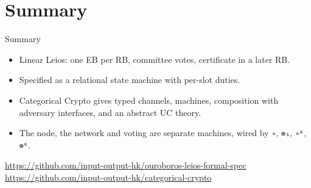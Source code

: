 \documentclass[aspectratio=169,10pt]{beamer}
\newcommand{\agda}[1]{\texttt{#1}}
\begin{document}
\section{Summary}


\begin{frame}{Summary}
  \begin{itemize}
    \item Linear Leios: one EB per RB, committee votes, certificate in a
          later RB.
    \item Specified as a relational state machine with per-slot duties.
    \item Categorical Crypto gives typed channels, machines, composition
          with adversary interfaces, and an abstract UC theory.
    \item The node, the network and voting are separate machines, wired by
          \agda{∘}, \agda{⊗₁}, \agda{∘ᴷ}, \agda{⊗ᴷ}.
  \end{itemize}
  \vfill
  \centering\small
  \url{https://github.com/input-output-hk/ouroboros-leios-formal-spec}\\
  \url{https://github.com/input-output-hk/categorical-crypto}
\end{frame}
\end{document}
